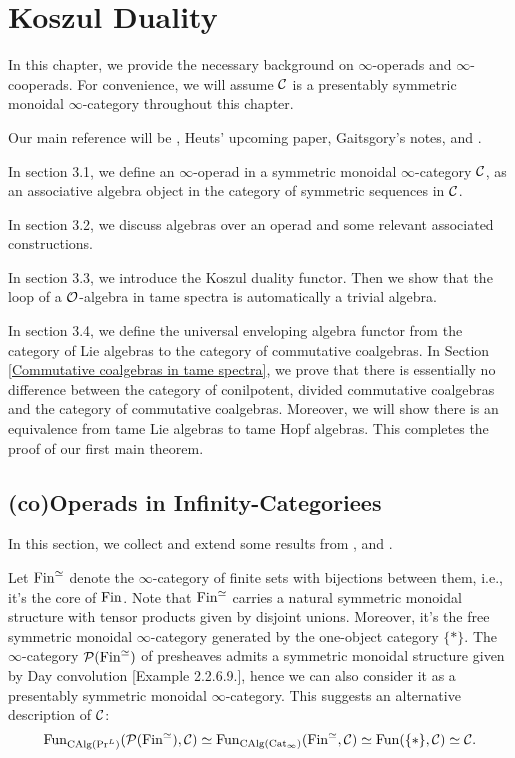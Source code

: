 \chapter{Koszul Duality}

In this chapter, we provide the necessary background on $\infty$-operads and $\infty$-cooperads. For convenience, we will assume ${\mathcal{C}}$ is a presentably symmetric monoidal $\infty$-category throughout this chapter.

Our main reference will be \cite{BrantnerPhD},  Heuts' upcoming paper, Gaitsgory's notes, \cite{Hadrianphdthesis} and \cite{HA}.
 
In section 3.1, we define an $\infty$-operad in a symmetric monoidal $\infty$-category ${\mathcal{C}}$, as an associative algebra object in the category of symmetric sequences in ${\mathcal{C}}$.

In section 3.2, we discuss algebras over an operad and some relevant associated constructions. 

In section 3.3, we introduce the Koszul duality functor. Then we show that the loop of a ${\mathcal{O}}$-algebra in tame spectra is automatically a trivial algebra.

In section 3.4, we define the universal enveloping algebra functor from the category of Lie algebras to the category of commutative coalgebras. 
In Section \ref{Commutative coalgebras in tame spectra}, we prove that there is essentially no difference between the category of conilpotent, divided commutative coalgebras and the category of commutative coalgebras.
Moreover, we will show there is an equivalence from tame Lie algebras to tame Hopf algebras. This completes the proof of our first main theorem.


\section{(co)Operads in Infinity-Categoriees}
In this section, we collect and extend some results from \cite{Francis-Gaitsgory}, \cite{HA} and \cite{HeutsSurvey}.

Let $\operatorname{Fin}^{\simeq}$ denote the $\infty$-category of finite sets with bijections between them, i.e., it's the core of $\operatorname{Fin}$. 
Note that $\operatorname{Fin}^{\simeq}$ carries a natural symmetric monoidal structure with tensor products given by disjoint unions. 
Moreover, it's the free symmetric monoidal $\infty$-category generated by the one-object category $\{*\}$.
The $\infty$-category ${\mathcal{P}}(\operatorname{Fin}^{\simeq})$ of presheaves admits a symmetric monoidal structure given by Day convolution \cite{HA}[Example 2.2.6.9.], hence we can also consider it as a presentably symmetric monoidal $\infty$-category. This suggests an alternative description of ${\mathcal{C}}$:
\[
\operatorname{Fun}_{\operatorname{CAlg}(\Pr^L)}({\mathcal{P}}(\operatorname{Fin}^{\simeq}), {\mathcal{C}}) 
\simeq 
\operatorname{Fun}_{\operatorname{CAlg}(\operatorname{Cat}_{\infty})} (\operatorname{Fin}^{\simeq}, {\mathcal{C}})
\simeq
\operatorname{Fun}(\{*\}, {\mathcal{C}})
\simeq 
{\mathcal{C}}.
\]


